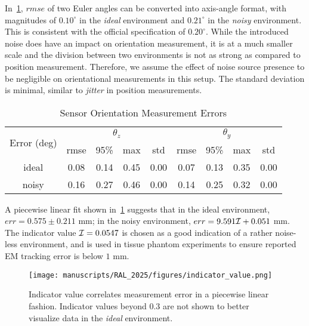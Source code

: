 In~\cref{tab:chap-5-sensor-ori-errors}, $rmse$ of two Euler angles can be converted into axis-angle format, with magnitudes of $0.10^\circ$ in the \textit{ideal} environment and $0.21^\circ$ in the \textit{noisy} environment. This is consistent with the official specification of $0.20^\circ$. While the introduced noise does have an impact on orientation measurement, it is at a much smaller scale and the division between two environments is not as strong as compared to position measurement. Therefore, we assume the effect of noise source presence to be negligible on orientational measurements in this setup. The standard deviation is minimal, similar to \textit{jitter} in position measurements.

\begin{table}[]
\centering
\caption{Sensor Orientation Measurement Errors}
\label{tab:chap-5-sensor-ori-errors}
\begin{tabular}{c|cccc|cccc}
\toprule
\multirow{2}{*}{Error (deg)} & \multicolumn{4}{c|}{$\theta_z$} & \multicolumn{4}{c}{$\theta_y$} \\
                            & rmse  & 95\%  & max   & std    & rmse  & 95\%  & max   & std    \\ \hline
ideal                       & 0.08  & 0.14  & 0.45  & 0.00   & 0.07  & 0.13  & 0.35  & 0.00   \\
noisy                       & 0.16  & 0.27  & 0.46  & 0.00   & 0.14  & 0.25  & 0.32  & 0.00   \\
\bottomrule
\end{tabular}
\par\smallskip
\end{table}

A piecewise linear fit shown in~\cref{fig:chap-5-indicator-value} suggests that in the ideal environment, $err = 0.575\pm 0.211$ mm; in the noisy environment, $err = 9.591\mathcal{I} + 0.051$ mm. The indicator value $\mathcal{I} = 0.0547$ is chosen as a good indication of a rather noise-less environment, and is used in tissue phantom experiments to ensure reported EM tracking error is below $1$ mm.

\begin{figure}[h]
  \centering
  \texttt{[image: manuscripts/RAL\_2025/figures/indicator\_value.png]}
  \caption{Indicator value correlates measurement error in a piecewise linear fashion. Indicator values beyond 0.3 are not shown to better visualize data in the \textit{ideal} environment.}
  \label{fig:chap-5-indicator-value}
\end{figure}


